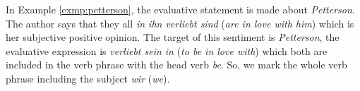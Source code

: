 \documentclass[11pt,a4paper]{article}
\theoremstyle{mytheoremstyle}
\newcommand{\mtag}[2]{{\upshape[\emph{#2}\upshape]$_{\textrm{\bfseries\emph{\tiny
        #1}}}$}}
\newcommand{\sentiment}[2][]{\mtag{sen\-ti\-ment\ifstrempty{#1}{}{:#1}}{#2}}
\begin{document}
In Example \ref{exmp:petterson}, the evaluative statement is made
about \textit{Petterson}.  The author says that they all \textit{in
  ihn verliebt sind} (\textit{are in love with him}) which is her
subjective positive opinion.  The target of this sentiment is
\textit{Petterson}, the evaluative expression is \textit{verliebt sein
  in} (\textit{to be in love with}) which both are included in the
verb phrase with the head verb \textit{be}.  So, we mark the whole
verb phrase including the subject \textit{wir} (\textit{we}).

\end{document}
